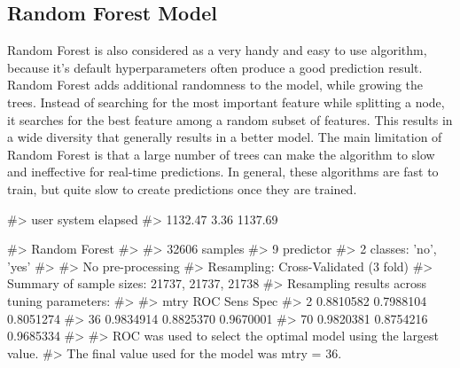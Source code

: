\hypertarget{random-forest-model}{%
\subsection{Random Forest Model}\label{random-forest-model}}

Random Forest is also considered as a very handy and easy to use
algorithm, because it's default hyperparameters often produce a good
prediction result. Random Forest adds additional randomness to the
model, while growing the trees. Instead of searching for the most
important feature while splitting a node, it searches for the best
feature among a random subset of features. This results in a wide
diversity that generally results in a better model. The main limitation
of Random Forest is that a large number of trees can make the algorithm
to slow and ineffective for real-time predictions. In general, these
algorithms are fast to train, but quite slow to create predictions once
they are trained.

\begin{Schunk}
\begin{Soutput}
#>    user  system elapsed 
#> 1132.47    3.36 1137.69
\end{Soutput}
\begin{Soutput}
#> Random Forest 
#> 
#> 32606 samples
#>     9 predictor
#>     2 classes: 'no', 'yes' 
#> 
#> No pre-processing
#> Resampling: Cross-Validated (3 fold) 
#> Summary of sample sizes: 21737, 21737, 21738 
#> Resampling results across tuning parameters:
#> 
#>   mtry  ROC        Sens       Spec     
#>    2    0.8810582  0.7988104  0.8051274
#>   36    0.9834914  0.8825370  0.9670001
#>   70    0.9820381  0.8754216  0.9685334
#> 
#> ROC was used to select the optimal model using the largest value.
#> The final value used for the model was mtry = 36.
\end{Soutput}
\end{Schunk}

